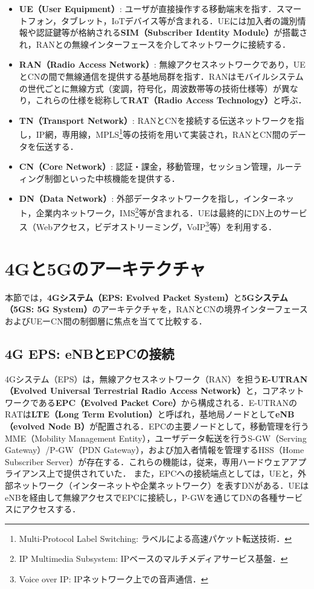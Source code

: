 \begin{itemize}
  \item \textbf{UE（User Equipment）}: ユーザが直接操作する移動端末を指す．スマートフォン，タブレット，IoTデバイス等が含まれる．UEには加入者の識別情報や認証鍵等が格納される\textbf{SIM（Subscriber Identity Module）}が搭載され，RANとの無線インターフェースを介してネットワークに接続する．
  \item \textbf{RAN（Radio Access Network）}: 無線アクセスネットワークであり，UEとCNの間で無線通信を提供する基地局群を指す．RANはモバイルシステムの世代ごとに無線方式（変調，符号化，周波数帯等の技術仕様等）が異なり，これらの仕様を総称して\textbf{RAT（Radio Access Technology）}と呼ぶ．
  \item \textbf{TN（Transport Network）}: RANとCNを接続する伝送ネットワークを指し，IP網，専用線，MPLS\footnote{Multi-Protocol Label Switching: ラベルによる高速パケット転送技術．}等の技術を用いて実装され，RANとCN間のデータを伝送する．
  \item \textbf{CN（Core Network）}: 認証・課金，移動管理，セッション管理，ルーティング制御といった中核機能を提供する．
  \item \textbf{DN（Data Network）}: 外部データネットワークを指し，インターネット，企業内ネットワーク，IMS\footnote{IP Multimedia Subsystem: IPベースのマルチメディアサービス基盤．}等が含まれる．UEは最終的にDN上のサービス（Webアクセス，ビデオストリーミング，VoIP\footnote{Voice over IP: IPネットワーク上での音声通信．}等）を利用する．
\end{itemize}

\section{4Gと5Gのアーキテクチャ}

本節では，\textbf{4Gシステム（EPS: Evolved Packet System）}と\textbf{5Gシステム（5GS: 5G System）}のアーキテクチャを，RANとCNの境界インターフェースおよびUEーCN間の制御層に焦点を当てて比較する．

\subsection{4G EPS: eNBとEPCの接続}

4Gシステム（EPS）は，無線アクセスネットワーク（RAN）を担う\textbf{E-UTRAN（Evolved Universal Terrestrial Radio Access Network）}と，コアネットワークである\textbf{EPC（Evolved Packet Core）}から構成される\cite{3GPP_TS23401}．E-UTRANのRATは\textbf{LTE（Long Term Evolution）}と呼ばれ，基地局ノードとして\textbf{eNB（evolved Node B）}が配置される．EPCの主要ノードとして，移動管理を行うMME（Mobility Management Entity），ユーザデータ転送を行うS-GW（Serving Gateway）/P-GW（PDN Gateway），および加入者情報を管理するHSS（Home Subscriber Server）が存在する．これらの機能は，従来，専用ハードウェアアプライアンス上で提供されていた\cite{etsi_nfv_2012}．
また，EPCへの接続端点としては，UEと，外部ネットワーク（インターネットや企業ネットワーク）を表すDNがある．UEはeNBを経由して無線アクセスでEPCに接続し，P-GWを通じてDNの各種サービスにアクセスする．

